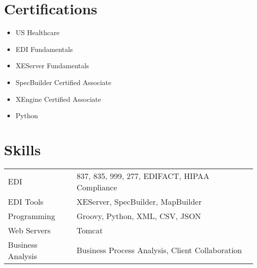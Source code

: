 \documentclass[a4paper,10pt]{article}
\begin{document}
\section{Certifications}
\begin{multicols}{2}
\begin{itemize}[leftmargin=1em,itemsep=2pt]
    \item US Healthcare
    \item EDI Fundamentals
    \item XEServer Fundamentals
    \item SpecBuilder Certified Associate
    \item XEngine Certified Associate
    \item Python
\end{itemize}
\end{multicols}

\section{Skills}
\begin{tabularx}{\linewidth}{@{}l X@{}}
EDI & 837, 835, 999, 277, EDIFACT, HIPAA Compliance \\
EDI Tools & XEServer, SpecBuilder, MapBuilder \\
Programming & Groovy, Python, XML, CSV, JSON \\
Web Servers & Tomcat \\
Business Analysis & Business Process Analysis, Client Collaboration \\
\end{tabularx}

\vfill
{}
\end{document}
